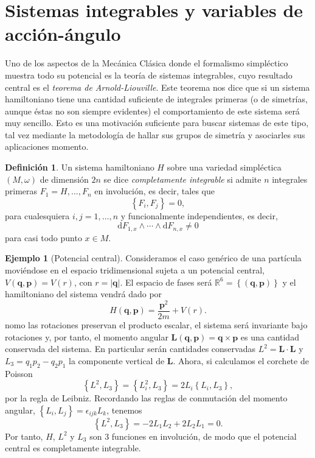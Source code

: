\documentclass[12pt,a4paper,twoside]{article}
\theoremstyle{definition} \newtheorem{defn}[thm]{Definición}
\theoremstyle{definition} \newtheorem{ejemplo}[thm]{Ejemplo}
\theoremstyle{definition} \newtheorem{ejercicio}[thm]{Ejercicio}
\theoremstyle{remark} \newtheorem*{obs}{Observación}
\def\RR{\mathbb{R}}
\def\dd{\mathrm{d}}
\newcommand{\vect}[1]{\mathbf{#1}}
\newcommand{\pois}[2]{\left\lbrace#1,#2\right\rbrace}
\begin{document}
  \section{Sistemas integrables y variables de acción-ángulo}

  Uno de los aspectos de la Mecánica Clásica donde el formalismo simpléctico muestra todo su potencial es la teoría de sistemas integrables, cuyo resultado central es el \emph{teorema de Arnold-Liouville}.
  Este teorema nos dice que si un sistema hamiltoniano tiene una cantidad suficiente de integrales primeras (o de simetrías, aunque éstas no son siempre evidentes) el comportamiento de este sistema será muy sencillo. Esto es una motivación suficiente para buscar sistemas de este tipo, tal vez mediante la metodología de hallar sus grupos de simetría y asociarles sus aplicaciones momento.

  \begin{defn}
    Un sistema hamiltoniano $H$ sobre una variedad simpléctica $(M,\omega)$ de dimensión $2n$ se dice \emph{completamente integrable} si admite $n$ integrales primeras $F_1=H,\dots,F_n$ en involución, es decir, tales que
    \begin{equation}
      \left\{ F_i,F_j \right\}=0,  
    \end{equation}
    para cualesquiera $i,j=1,\dots,n$ y funcionalmente independientes, es decir,
    \begin{equation}
      \dd F_{1,x} \wedge \cdots \wedge \dd F_{n,x}\neq 0
    \end{equation}
    para casi todo punto $x\in M$.
  \end{defn}

  \begin{ejemplo}[Potencial central]
    Consideramos el caso genérico de una partícula moviéndose en el espacio tridimensional sujeta a un potencial central, $V(\vect{q},\vect{p})=V(r)$, con $r=|\vect{q}|$. El espacio de fases será $\RR^6=\left\{ (\vect{q},\vect{p}) \right\}$ y el hamiltoniano del sistema vendrá dado por
    \begin{equation}
      H(\vect{q},\vect{p})=\frac{\vect{p}^2}{2m}+V(r).
      \label{eq:central}
    \end{equation}
    nomo las rotaciones preservan el producto escalar, el sistema será invariante bajo rotaciones y, por tanto, el momento angular $\vect{L}(\vect{q},\vect{p})=\vect{q}\times \vect{p}$ es una cantidad conservada del sistema. En particular serán cantidades conservadas $L^2=\vect{L}\cdot \vect{L}$ y $L_3=q_1p_2-q_2p_1$ la componente vertical de $\vect{L}$. Ahora, si calculamos el corchete de Poisson
  \begin{equation*}
    \pois{L^2}{L_3}=\pois{L_i^2}{L_3}=2L_i\pois{L_i}{L_3},
  \end{equation*}
  por la regla de Leibniz. Recordando las reglas de conmutación del momento angular, $\left\{ L_i,L_j \right\}=\epsilon_{ijk}L_k$, tenemos
\begin{equation*}
  \pois{L^2}{L_3}=-2L_1L_2+2L_2L_1=0.
\end{equation*}
Por tanto, $H$, $L^2$ y $L_3$ son $3$ funciones en involución, de modo que el potencial central es completamente integrable.
  \end{ejemplo}
\end{document}
